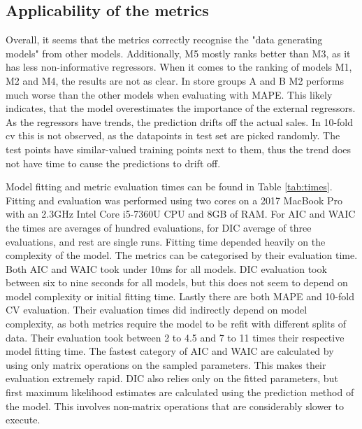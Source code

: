 \documentclass[english, 12pt, a4paper, sci, utf8, a-1b, online]{aaltothesis}
\begin{document}
\begin{abstractpage}[english]

\subsection{Applicability of the metrics}


Overall, it seems that the metrics correctly recognise the "data generating models" from other models. Additionally, M5 mostly ranks better than M3, as it has less non-informative regressors. When it comes to the ranking of models M1, M2 and M4, the results are not as clear. In store groups A and B M2 performs much worse than the other models when evaluating with MAPE. This likely indicates, that the model overestimates the importance of the external regressors. As the regressors have trends, the prediction drifts off the actual sales. In 10-fold cv this is not observed, as the datapoints in test set are picked randomly. The test points have similar-valued training points next to them, thus the trend does not have time to cause the predictions to drift off.

Model fitting and metric evaluation times can be found in Table \ref{tab:times}. Fitting and evaluation was performed using two cores on a 2017 MacBook Pro with an 2.3GHz Intel Core i5-7360U CPU and 8GB of RAM. For AIC and WAIC the times are averages of hundred evaluations, for DIC average of three evaluations, and rest are single runs. Fitting time depended heavily on the complexity of the model. The metrics can be categorised by their evaluation time. Both AIC and WAIC took under 10ms for all models. DIC evaluation took between six to nine seconds for all models, but this does not seem to depend on model complexity or initial fitting time. Lastly there are both MAPE and 10-fold CV evaluation. Their evaluation times did indirectly depend on model complexity, as both metrics require the model to be refit with different splits of data. Their evaluation took between 2 to 4.5 and 7 to 11 times their respective model fitting time. The fastest category of AIC and WAIC are calculated by using only matrix operations on the sampled parameters. This makes their evaluation extremely rapid. DIC also relies only on the fitted parameters, but first maximum likelihood estimates are calculated using the prediction method of the model. This involves non-matrix operations that are considerably slower to execute. 


\end{abstractpage}
\end{document}
